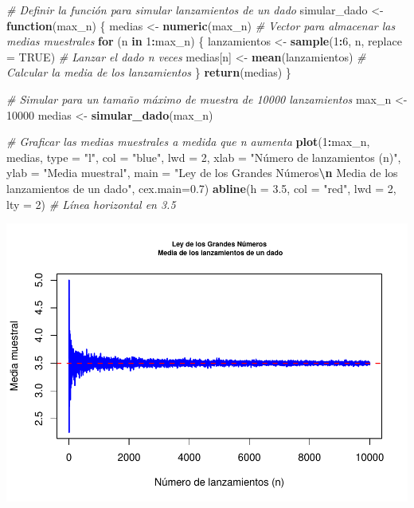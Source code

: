 \documentclass[
]{article}
\newenvironment{Shaded}{\begin{snugshade}}{\end{snugshade}}
\newcommand{\AttributeTok}[1]{\textcolor[rgb]{0.13,0.29,0.53}{#1}}
\newcommand{\CommentTok}[1]{\textcolor[rgb]{0.56,0.35,0.01}{\textit{#1}}}
\newcommand{\ConstantTok}[1]{\textcolor[rgb]{0.56,0.35,0.01}{#1}}
\newcommand{\ControlFlowTok}[1]{\textcolor[rgb]{0.13,0.29,0.53}{\textbf{#1}}}
\newcommand{\DecValTok}[1]{\textcolor[rgb]{0.00,0.00,0.81}{#1}}
\newcommand{\FloatTok}[1]{\textcolor[rgb]{0.00,0.00,0.81}{#1}}
\newcommand{\FunctionTok}[1]{\textcolor[rgb]{0.13,0.29,0.53}{\textbf{#1}}}
\newcommand{\NormalTok}[1]{#1}
\newcommand{\OtherTok}[1]{\textcolor[rgb]{0.56,0.35,0.01}{#1}}
\newcommand{\SpecialCharTok}[1]{\textcolor[rgb]{0.81,0.36,0.00}{\textbf{#1}}}
\newcommand{\StringTok}[1]{\textcolor[rgb]{0.31,0.60,0.02}{#1}}
\begin{document}
\begin{Shaded}
\begin{Highlighting}[]
\CommentTok{\# Definir la función para simular lanzamientos de un dado}
\NormalTok{simular\_dado }\OtherTok{\textless{}{-}} \ControlFlowTok{function}\NormalTok{(max\_n) \{}
\NormalTok{  medias }\OtherTok{\textless{}{-}} \FunctionTok{numeric}\NormalTok{(max\_n)  }\CommentTok{\# Vector para almacenar las medias muestrales}
  \ControlFlowTok{for}\NormalTok{ (n }\ControlFlowTok{in} \DecValTok{1}\SpecialCharTok{:}\NormalTok{max\_n) \{}
\NormalTok{    lanzamientos }\OtherTok{\textless{}{-}} \FunctionTok{sample}\NormalTok{(}\DecValTok{1}\SpecialCharTok{:}\DecValTok{6}\NormalTok{, n, }\AttributeTok{replace =} \ConstantTok{TRUE}\NormalTok{)  }\CommentTok{\# Lanzar el dado n veces}
\NormalTok{    medias[n] }\OtherTok{\textless{}{-}} \FunctionTok{mean}\NormalTok{(lanzamientos)  }\CommentTok{\# Calcular la media de los lanzamientos}
\NormalTok{  \}}
  \FunctionTok{return}\NormalTok{(medias)}
\NormalTok{\}}

\CommentTok{\# Simular para un tamaño máximo de muestra de 10000 lanzamientos}
\NormalTok{max\_n }\OtherTok{\textless{}{-}} \DecValTok{10000}
\NormalTok{medias }\OtherTok{\textless{}{-}} \FunctionTok{simular\_dado}\NormalTok{(max\_n)}

\CommentTok{\# Graficar las medias muestrales a medida que n aumenta}
\FunctionTok{plot}\NormalTok{(}\DecValTok{1}\SpecialCharTok{:}\NormalTok{max\_n, medias, }\AttributeTok{type =} \StringTok{"l"}\NormalTok{, }\AttributeTok{col =} \StringTok{"blue"}\NormalTok{, }\AttributeTok{lwd =} \DecValTok{2}\NormalTok{,}
     \AttributeTok{xlab =} \StringTok{"Número de lanzamientos (n)"}\NormalTok{, }\AttributeTok{ylab =} \StringTok{"Media muestral"}\NormalTok{,}
     \AttributeTok{main =} \StringTok{"Ley de los Grandes Números}\SpecialCharTok{\textbackslash{}n}\StringTok{ Media de los lanzamientos de un dado"}\NormalTok{, }\AttributeTok{cex.main=}\FloatTok{0.7}\NormalTok{)}
\FunctionTok{abline}\NormalTok{(}\AttributeTok{h =} \FloatTok{3.5}\NormalTok{, }\AttributeTok{col =} \StringTok{"red"}\NormalTok{, }\AttributeTok{lwd =} \DecValTok{2}\NormalTok{, }\AttributeTok{lty =} \DecValTok{2}\NormalTok{)  }\CommentTok{\# Línea horizontal en 3.5}
\end{Highlighting}
\end{Shaded}

\includegraphics{docs/imagenes/unnamed-chunk-13-1.pdf}
\end{document}
